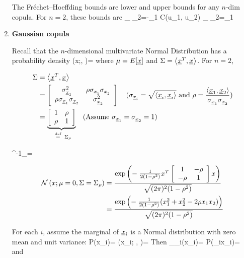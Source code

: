 \begin{enumerate}
The Fréchet–Hoeffding bounds
are lower and upper bounds
for any $n$-dim copula.
For $n=2$, these bounds are
\beq
{}_
{\rvx_2=-\alp \rvx_1}
\leq C(u_1, u_2)\leq
{}_{
\rvx_2=\alp\rvx_1}
\eeq

\item {\bf Gaussian copula}

Recall that the $n$-dimensional
multivariate Normal Distribution
has a probability density
\beq
\caln(x;\mu, \Sigma)=
{}
\eeq
where $\mu= E[\rvx]$ and
$\Sigma = \av{\rvx^T, \rvx}$.
For $n=2$,

\begin{align}
\Sigma&=
\av{\rvx^T, \rvx}
\\
&=
\left[
\begin{array}{cc}
\s_{\rvx_1}^2
&\rho \s_{\rvx_1}\s_{\rvx_2}
\\
\rho \s_{\rvx_1}\s_{\rvx_2}
&\s_{\rvx_2}^2
\end{array}
\right]
\quad (\s_{\rvx_i} = \sqrt{\av{\rvx_i, \rvx_i}}
\text{ and } \rho  = \frac{\av{\rvx_1, \rvx_2}}{\s_{\rvx_1}\s_{\rvx_2}})
\\
&=
\underbrace{
\left[
\begin{array}{cc}
1
&\rho
\\
\rho
&1
\end{array}
\right]}_{\eqdef \Sigma_\rho}
\quad(\text{Assume }
\s_{\rvx_1}=\s_{\rvx_2}=1)
\end{align}

\beq
\Sigma^{-1}_\rho=
\eeq


\begin{align}
{\cal N}\left(x; \mu=0, \Sigma=
\Sigma_\rho
\right)
&=
\frac{
\exp\left(
-\;\frac{1}{2(1-\rho^2)}x^T
\left[
\begin{array}{cc}
1&-\rho
\\
-\rho&1
\end{array}
\right]x
\right)}
{\sqrt{(2\pi)^2(1-\rho^2)}}
\\
&=
\frac{
\exp\left(
-\;\frac{1}{2(1-\rho^2)}
(x_1^2 + x_2^2-
2\rho x_1 x_2)
\right)}
{\sqrt{(2\pi)^2(1-\rho^2)}}
\end{align}

For each $i$,
assume the marginal
of $\rvx_i$ is a  Normal
distribution with zero mean and
unit variance:
\beq
P(x_i)= \caln(x_i; , )=
\eeq
Then 
\beq
\Phi_{\rvx_i}(x_i)=
P(\rvx_i\leq x_i)=
\eeq
and


\end{enumerate}
